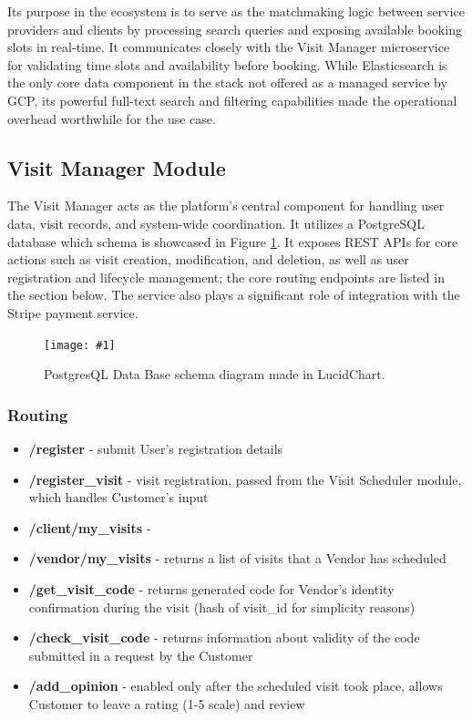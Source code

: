 \documentclass[11pt,a4paper]{article}
\newcommand{\fullpageimage}[1]{%
  \begin{adjustwidth*}{-0.1666\paperwidth}{-0.1666\paperwidth}
    \noindent\texttt{[image: \#1]}
  \end{adjustwidth*}
}
\begin{document}
Its purpose in the ecosystem is to serve as the matchmaking logic
between service providers and clients by processing search queries
and exposing available booking slots in real-time. It communicates
closely with the Visit Manager microservice for validating time slots
and availability before booking. While Elasticsearch is the only core
data component in the stack not offered as a managed service by GCP,
its powerful full-text search and filtering capabilities made the
operational overhead worthwhile for the use case.


\subsection{Visit Manager Module}

The Visit Manager acts as the platform’s central component for
handling user data, visit records, and system-wide coordination. It
utilizes a PostgreSQL database which schema is showcased in Figure
\ref{fig:db_schema}. It exposes REST APIs for core actions such as
visit creation, modification, and deletion, as well as user
registration and lifecycle management; the core routing endpoints are
listed in the section below.
The service also plays a significant role of integration with the
Stripe payment service.

\begin{figure}
  \centering
  \fullpageimage{db_schema.png}
  \caption[Data Base schema.]{PostgresQL Data Base schema diagram
  made in LucidChart.}
  \label{fig:db_schema}
\end{figure}

\subsubsection{Routing}
\begin{itemize}
  \item \textbf{\slash register} - submit User's registration details
  \item \textbf{\slash register\_visit} - visit registration, passed
    from the Visit Scheduler module, which handles Customer's input
  \item \textbf{\slash client/my\_visits} -
  \item \textbf{\slash vendor/my\_visits} - returns a list of visits
    that a Vendor has scheduled
  \item \textbf{\slash get\_visit\_code} - returns generated code for
    Vendor's identity confirmation during the visit (hash of
    visit\_id for simplicity reasons)
  \item \textbf{\slash check\_visit\_code} - returns information
    about validity of the code submitted in a request by the Customer
  \item \textbf{\slash add\_opinion} - enabled only after the
    scheduled visit took place, allows Customer to leave a rating
    (1-5 scale) and review
\end{itemize}
\end{document}
